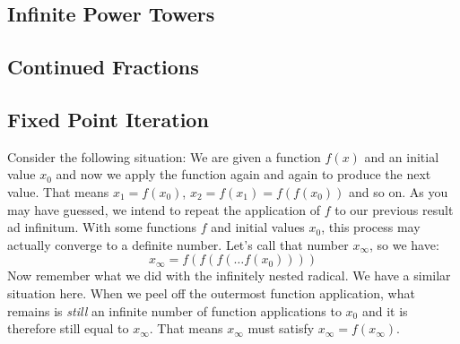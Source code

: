 \subsection{Infinite Power Towers}





\subsection{Continued Fractions}






\subsection{Fixed Point Iteration}
Consider the following situation: We are given a function $f(x)$ and an initial value $x_0$ and now we apply the function again and again to produce the next value. That means $x_1 = f(x_0)$, $x_2 = f(x_1) = f(f(x_0))$ and so on. As you may have guessed, we intend to repeat the application of $f$ to our previous result ad infinitum. With some functions $f$ and initial values $x_0$, this process may actually converge to a definite number. Let's call that number $x_{\infty}$, so we have:
\begin{equation}
 x_{\infty} = f(f(f( \ldots f(x_0))))
\end{equation}
Now remember what we did with the infinitely nested radical. We have a similar situation here. When we peel off the outermost function application, what remains is \emph{still} an infinite number of function applications to $x_0$ and it is therefore still equal to $x_{\infty}$. That means $x_{\infty}$ must satisfy $x_{\infty} = f(x_{\infty})$.

